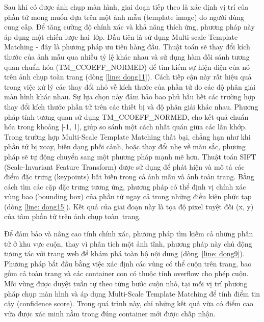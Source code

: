 \documentclass[a4paper, 12pt]{report}
\begin{document}
{Sau khi có được ảnh chụp màn hình, giai đoạn tiếp theo là xác định vị trí của phần tử mong muốn dựa trên một ảnh mẫu (template image) do người dùng cung cấp. Để tăng cường độ chính xác và khả năng thích ứng, phương pháp này áp dụng một chiến lược hai~lớp. Đầu tiên là sử dụng Multi-scale Template Matching - đây là phương pháp ưu tiên hàng đầu. Thuật toán sẽ thay đổi kích thước của ảnh mẫu qua nhiều tỷ lệ khác nhau và sử dụng hàm đối sánh tương quan chuẩn hóa (TM\_CCOEFF\_NORMED) để tìm kiếm sự hiện diện của nó trên ảnh chụp toàn trang (dòng \ref{line: dong11}). Cách tiếp cận này rất hiệu quả trong việc xử lý các thay đổi nhỏ về kích thước của phần tử do các độ phân giải màn hình khác nhau. Sự lựa chọn này đảm bảo bao phủ hầu hết các trường hợp thay đổi kích thước phần tử trên các thiết bị và độ phân giải khác nhau. Phương pháp tính tương quan sử dụng TM\_CCOEFF\_NORMED, cho kết quả chuẩn hóa trong khoảng [-1, 1], giúp so sánh một cách nhất quán giữa các lần khớp. Trong trường hợp Multi-Scale Template Matching thất bại, chẳng hạn như khi phần tử bị xoay, biến dạng phối cảnh, hoặc thay đổi nhẹ về màu sắc, phương pháp sẽ tự động chuyển sang một phương pháp mạnh mẽ hơn. Thuật toán SIFT (Scale-Invariant Feature Transform) được sử dụng để phát hiện và mô tả các điểm đặc trưng (keypoints) bất biến trong cả ảnh mẫu và ảnh toàn trang. Bằng cách tìm các cặp đặc trưng tương ứng, phương pháp có thể định vị chính xác vùng bao (bounding box) của phần tử ngay cả trong những điều kiện phức tạp (dòng \ref{line: dong15}). Kết quả của giai đoạn này là tọa độ pixel tuyệt đối (x, y) của tâm phần tử trên ảnh chụp toàn~trang.



Để đảm bảo và nâng cao tính chính xác, phương pháp tìm kiếm cả những phần tử ở khu vực cuộn, thay vì phân tích một ảnh tĩnh, phương pháp này chủ động tương tác với trang web để khám phá toàn bộ nội dung (dòng~\ref{line: dong9}). Phương pháp bắt đầu bằng việc xác định các vùng có thể cuộn trên trang, bao gồm cả toàn trang và các container con có thuộc tính overflow cho phép cuộn. Mỗi vùng được duyệt tuần tự theo từng bước cuộn nhỏ, tại mỗi vị trí phương pháp chụp màn hình và áp dụng Multi-Scale Template Matching để tính điểm tin cậy (confidence score). Trong quá trình này, chỉ những kết quả vừa có điểm cao vừa được xác minh nằm trong đúng container mới được chấp nhận. 

}
\end{document}
